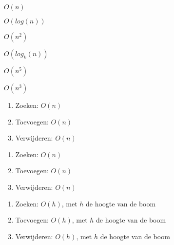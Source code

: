 \begin{opl}{11.1}
\(O(n)\)
\end{opl}

\begin{opl}{11.2}
\(O(log(n))\)
\end{opl}

\begin{opl}{11.3}
\(O(n^2)\)
\end{opl}

\begin{opl}{11.4}
\(O(log_k(n))\)
\end{opl}

\begin{opl}{11.5}
\(O(n^5)\)
\end{opl}

\begin{opl}{11.6}
\(O(n^3)\)
\end{opl}

\begin{opl}{11.7}
\begin{enumerate}
\item Zoeken: \(O(n)\)
\item Toevoegen: \(O(n)\) 
\item Verwijderen: \(O(n)\) 
\end{enumerate}
\end{opl}

\begin{opl}{11.8}
\begin{enumerate}
\item Zoeken: \(O(n)\)
\item Toevoegen: \(O(n)\) 
\item Verwijderen: \(O(n)\) 
\end{enumerate}
\end{opl}

\begin{opl}{11.9}
\begin{enumerate}
\item Zoeken: \(O(h)\), met \(h\) de hoogte van de boom
\item Toevoegen: \(O(h)\), met \(h\) de hoogte van de boom 
\item Verwijderen: \(O(h)\), met \(h\) de hoogte van de boom 
\end{enumerate}
\end{opl}


